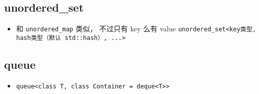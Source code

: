 \subsection{unordered_set}
\begin{itemize}
\item 和 \verb|unordered_map| 类似， 不过只有 key 么有 value \verb|unordered_set<key类型, hash类型（默认 std::hash）, ...>|
\end{itemize}

\subsection{queue}
\begin{itemize}
\item \verb|queue<class T, class Container = deque<T>>|
\end{itemize}

